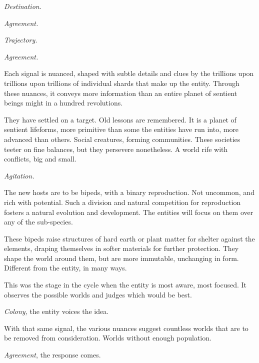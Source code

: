 \emph{Destination.}



\emph{Agreement.}



\emph{Trajectory.}



\emph{Agreement.}



Each signal is nuanced, shaped with subtle details and clues by the trillions upon trillions upon trillions of individual shards that make up the entity.  Through these nuances, it conveys more information than an entire planet of sentient beings might in a hundred revolutions.



They have settled on a target.  Old lessons are remembered.  It is a planet of sentient lifeforms, more primitive than some the entities have run into, more advanced than others.  Social creatures, forming communities.  These societies teeter on fine balances, but they persevere nonetheless.  A world rife with conflicts, big and small.



\emph{Agitation.}



The new hosts are to be bipeds, with a binary reproduction.  Not uncommon, and rich with potential.  Such a division and natural competition for reproduction fosters a natural evolution and development.  The entities will focus on them over any of the sub-species.



These bipeds raise structures of hard earth or plant matter for shelter against the elements, draping themselves in softer materials for further protection.  They shape the world around them, but are more immutable, unchanging in form.  Different from the entity, in many ways.



This was the stage in the cycle when the entity is most aware, most focused.  It observes the possible worlds and judges which would be best.



\emph{Colony, }the entity voices the idea.



With that same signal, the various nuances suggest countless worlds that are to be removed from consideration.  Worlds without enough population.



\emph{Agreement}, the response comes.



